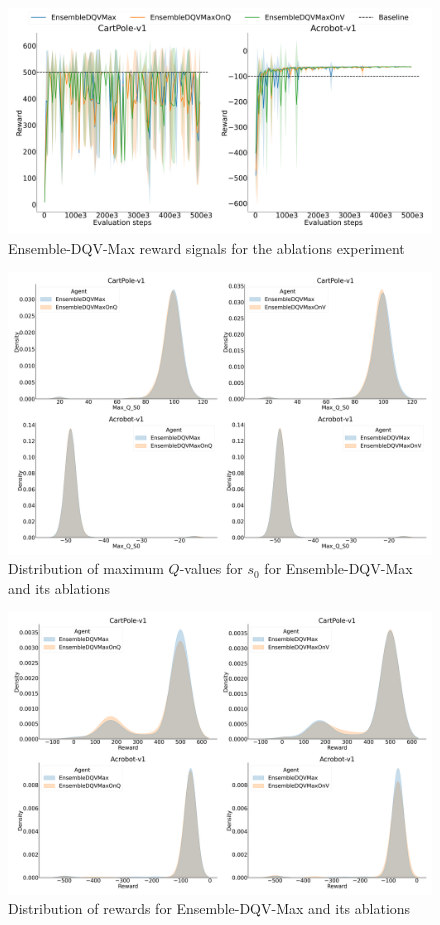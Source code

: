 \begin{figure}[H]
  \centering
  \includegraphics[width=.5\textwidth]{img/dshift_plots_ablation_rwd.png}
  \caption{Ensemble-DQV-Max reward signals for the ablations
    experiment}\label{fig:dshift_rwd_ablation}
\end{figure}

\begin{figure}[H]
  \centering
  \includegraphics[width=.5\textwidth]{img/dqvmax_abl_qv_dist.png}
  \caption{Distribution of maximum $Q$-values for $s_0$ for
    Ensemble-DQV-Max and its ablations}\label{fig:dqvmax_abl_qv_dist}
\end{figure}

\begin{figure}[H]
  \centering
  \includegraphics[width=.5\textwidth]{img/dqvmax_abl_rwd_dist.png}
  \caption{Distribution of rewards for Ensemble-DQV-Max and its
    ablations}\label{fig:dqvmax_abl_rwd_dist}
\end{figure}
